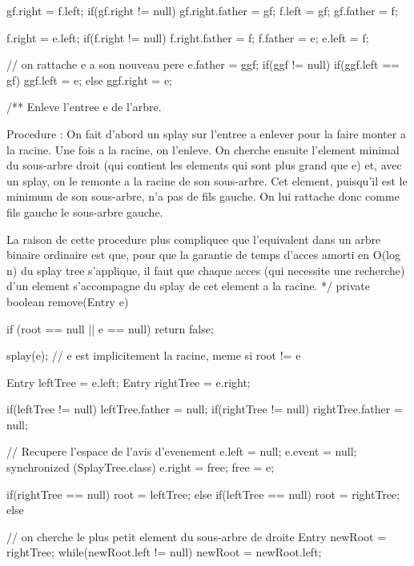 \begin{hide}
\begin{code}
\begin{hide}
{{{               gf.right = f.left;
               if(gf.right != null)
                  gf.right.father = gf;
               f.left = gf;
               gf.father = f;

               f.right = e.left;
               if(f.right != null)
                  f.right.father = f;
               f.father = e;
               e.left = f;

               // on rattache e a son nouveau pere
               e.father = ggf;
               if(ggf != null)
                  if(ggf.left == gf)
                     ggf.left = e;
                  else
                     ggf.right = e;
            }
      }
   }


   /**
      Enleve l'entree e de l'arbre.

      Procedure :
      On fait d'abord un splay sur l'entree a enlever pour la faire monter
      a la racine. Une fois a la racine, on l'enleve. On cherche ensuite
      l'element minimal du sous-arbre droit (qui contient les elements
      qui sont plus grand que e) et, avec un splay, on le remonte a la
      racine de son sous-arbre. Cet element, puisqu'il est le minimum de
      son sous-arbre, n'a pas de fils gauche. On lui rattache donc comme
      fils gauche le sous-arbre gauche.

      La raison de cette procedure plus compliquee que l'equivalent dans
      un arbre binaire ordinaire est que, pour que la garantie de
      temps d'acces amorti en O(log n) du splay tree s'applique, il
      faut que chaque acces (qui necessite une recherche) d'un element
      s'accompagne du splay de cet element a la racine.
    */
   private boolean remove(Entry e)
   {
      if (root == null || e == null)
         return false;

      splay(e);
      // e est implicitement la racine, meme si root != e

      Entry leftTree = e.left;
      Entry rightTree = e.right;

      if(leftTree != null)
         leftTree.father = null;
      if(rightTree != null)
         rightTree.father = null;

      // Recupere l'espace de l'avis d'evenement
      e.left = null;
      e.event = null;
      synchronized (SplayTree.class) {
         e.right = free;
         free = e;
      }


      if(rightTree == null)
         root = leftTree;
      else if(leftTree == null)
         root = rightTree;
      else {
         // on cherche le plus petit element du sous-arbre de droite
         Entry newRoot = rightTree;
         while(newRoot.left != null)
            newRoot = newRoot.left;

}}
\end{hide}
\end{code}
\end{hide}
